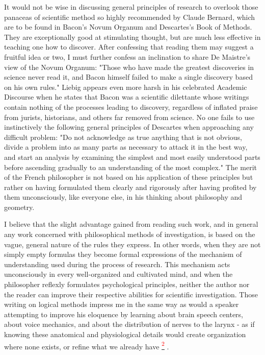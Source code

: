 \documentclass{article}
\newcommand{\noteref}[1]{%
 \hypertarget{ref:#1}{}%
 \hyperlink{note:#1}{\textsuperscript{\textcolor{red}{#1}}}%
}
\begin{document}
It would not be wise in discussing general principles of research to overlook those panaceas of scientific method so highly recommended by Claude Bernard, which are to be found in Bacon’s Novum Organum and Descartes’s Book of Methods. They are exceptionally good at stimulating thought, but are much less effective in teaching one how to discover. After confessing that reading them may suggest a fruitful idea or two, I must further confess an inclination to share De Maistre’s view of the Novum Organum: "Those who have made the greatest discoveries in science never read it, and Bacon himself failed to make a single discovery based on his own rules." Liebig appears even more harsh in his celebrated Academic Discourse when he states that Bacon was a scientific dilettante whose writings contain nothing of the processes leading to discovery, regardless of inflated praise from jurists, historians, and others far removed from science. No one fails to use instinctively the following general principles of Descartes when approaching any difficult problem: "Do not acknowledge as true anything that is not obvious, divide a problem into as many parts as necessary to attack it in the best way, and start an analysis by examining the simplest and most easily understood parts before ascending gradually to an understanding of the most complex." The merit of the French philosopher is not based on his application of these principles but rather on having formulated them clearly and rigorously after having profited by them unconsciously, like everyone else, in his thinking about philosophy and geometry.

I believe that the slight advantage gained from reading such work, and in general any work concerned with philosophical methods of investigation, is based on the vague, general nature of the rules they express. In other words, when they are not simply empty formulas they become formal expressions of the mechanism of understanding used during the process of research. This mechanism acts unconsciously in every well-organized and cultivated mind, and when the philosopher reflexly formulates psychological principles, neither the author nor the reader can improve their respective abilities for scientific investigation. Those writing on logical methods impress me in the same way as would a speaker attempting to improve his eloquence by learning about brain speech centers, about voice mechanics, and about the distribution of nerves to the larynx - as if knowing these anatomical and physiological details would create organization where none exists, or refine what we already have\noteref{2}.
\end{document}

